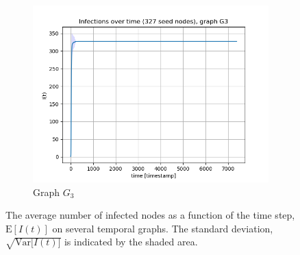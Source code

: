 \documentclass[letterpaper]{article}
\begin{document}
\begin{figure}
\begin{subfigure}[b]{0.32\textwidth}
        \includegraphics[width=\textwidth]{img/infections_G3.png}
        \caption{Graph \(G_3\)}
	    \label{fig:infections_over_time_G3}
    \end{subfigure}
    \caption{The average number of infected nodes as a function of the time step, $\mathrm{E}[I(t)]$ on several temporal graphs. The standard deviation, $\sqrt{\mathrm{Var}{[I(t)}]}$ is indicated by the shaded area.}
    \label{fig:infections_over_time}


\end{figure}
\end{document}
